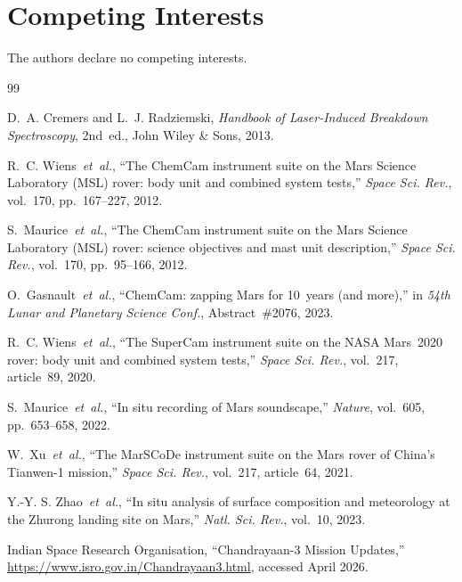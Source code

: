\documentclass[a4paper,twocolumn,10pt]{article}
\begin{document}
\section*{Competing Interests}

The authors declare no competing interests.


\begin{thebibliography}{99}

D.~A. Cremers and L.~J. Radziemski,
\textit{Handbook of Laser-Induced Breakdown Spectroscopy}, 2nd~ed.,
John Wiley \& Sons, 2013.

R.~C. Wiens~\emph{et~al.},
``The ChemCam instrument suite on the Mars Science Laboratory (MSL)
rover: body unit and combined system tests,''
\textit{Space Sci. Rev.}, vol.~170, pp.~167--227, 2012.

S.~Maurice~\emph{et~al.},
``The ChemCam instrument suite on the Mars Science Laboratory (MSL)
rover: science objectives and mast unit description,''
\textit{Space Sci. Rev.}, vol.~170, pp.~95--166, 2012.

O.~Gasnault~\emph{et~al.},
``ChemCam: zapping Mars for 10~years (and more),''
in \textit{54th Lunar and Planetary Science Conf.}, Abstract~\#2076,
2023.

R.~C. Wiens~\emph{et~al.},
``The SuperCam instrument suite on the NASA Mars~2020 rover: body
unit and combined system tests,''
\textit{Space Sci. Rev.}, vol.~217, article~89, 2020.

S.~Maurice~\emph{et~al.},
``In situ recording of Mars soundscape,''
\textit{Nature}, vol.~605, pp.~653--658, 2022.

W.~Xu~\emph{et~al.},
``The MarSCoDe instrument suite on the Mars rover of China's
Tianwen-1 mission,''
\textit{Space Sci. Rev.}, vol.~217, article~64, 2021.

Y.-Y. S. Zhao~\emph{et~al.},
``In situ analysis of surface composition and meteorology at the
Zhurong landing site on Mars,''
\textit{Natl. Sci. Rev.}, vol.~10, 2023.

Indian Space Research Organisation,
``Chandrayaan-3 Mission Updates,''
\url{https://www.isro.gov.in/Chandrayaan3.html},
accessed April 2026.


\end{thebibliography}
\end{document}
